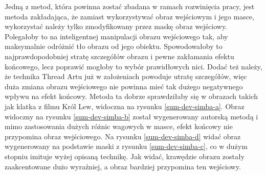     Jedną z metod, która powinna zostać zbadana w ramach rozwinięcia pracy, jest metoda zakładająca, że zamiast wykorzystywać obraz wejściowym i jego masce, wykorzystać należy tylko zmodyfikowany przez maskę obraz wejściowy. Polegałoby to na inteligentnej manipulacji obrazu wejściowego tak, aby maksymalnie odróżnić tło obrazu od jego obiektu. Spowodowałoby to najprawdopodobniej stratę szczegółów obrazu i pewne zakłamania efektu końcowego, lecz poprawić mogłoby to wybór prawidłowych nici. Dodać też należy, że technika Thread Artu już w założeniach powoduje utratę szczegółów, więc duża zmiana obrazu wejściowego nie powinna mieć tak dużego negatywnego wpływu na efekt końcowy. Metoda ta dobrze sprawdziłaby się w obrazach takich jak klatka z filmu Król Lew, widoczna na rysunku \ref{sum-dev-simba-a}. Obraz widoczny na rysunku \ref{sum-dev-simba-b} został wygenerowany autorską metodą i mimo zastosowania dużych różnic wagowych w masce, efekt końcowy nie przypomina obraz wejściowego. Na rysunku \ref{sum-dev-simba-d} widać obraz wygenerowany na podstawie maski z rysunku \ref{sum-dev-simba-c}, co w dużym stopniu imituje wyżej opisaną technikę. Jak widać, krawędzie obrazu zostały zaakcentowane dużo wyraźniej, a obraz bardziej przypomina ten wejściowy.
